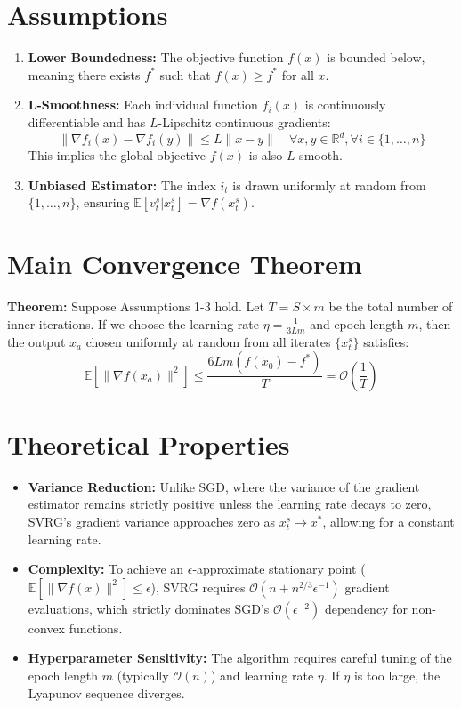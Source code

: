 \documentclass[11pt]{article}
\begin{document}
\section*{Assumptions}
\begin{enumerate}
    \item \textbf{Lower Boundedness:} The objective function $f(x)$ is bounded below, meaning there exists $f^*$ such that $f(x) \ge f^*$ for all $x$.
    \item \textbf{L-Smoothness:} Each individual function $f_i(x)$ is continuously differentiable and has $L$-Lipschitz continuous gradients:
    \begin{equation}
        \|\nabla f_i(x) - \nabla f_i(y)\| \le L \|x - y\| \quad \forall x, y \in \mathbb{R}^d, \forall i \in \{1, \dots, n\}
    \end{equation}
    This implies the global objective $f(x)$ is also $L$-smooth.
    \item \textbf{Unbiased Estimator:} The index $i_t$ is drawn uniformly at random from $\{1, \dots, n\}$, ensuring $\mathbb{E}[v_t^s | x_t^s] = \nabla f(x_t^s)$.
\end{enumerate}

\section*{Main Convergence Theorem}
\textbf{Theorem:} Suppose Assumptions 1-3 hold. Let $T = S \times m$ be the total number of inner iterations. If we choose the learning rate $\eta = \frac{1}{3Lm}$ and epoch length $m$, then the output $x_a$ chosen uniformly at random from all iterates $\{x_t^s\}$ satisfies:
\begin{equation}
    \mathbb{E}[\|\nabla f(x_a)\|^2] \le \frac{6Lm(f(\tilde{x}_0) - f^*)}{T} = \mathcal{O}\left(\frac{1}{T}\right)
\end{equation}

\section*{Theoretical Properties}
\begin{itemize}
    \item \textbf{Variance Reduction:} Unlike SGD, where the variance of the gradient estimator remains strictly positive unless the learning rate decays to zero, SVRG's gradient variance approaches zero as $x_t^s \to x^*$, allowing for a constant learning rate.
    \item \textbf{Complexity:} To achieve an $\epsilon$-approximate stationary point ($\mathbb{E}[\|\nabla f(x)\|^2] \le \epsilon$), SVRG requires $\mathcal{O}(n + n^{2/3}\epsilon^{-1})$ gradient evaluations, which strictly dominates SGD's $\mathcal{O}(\epsilon^{-2})$ dependency for non-convex functions.
    \item \textbf{Hyperparameter Sensitivity:} The algorithm requires careful tuning of the epoch length $m$ (typically $\mathcal{O}(n)$) and learning rate $\eta$. If $\eta$ is too large, the Lyapunov sequence diverges.
\end{itemize}
\end{document}
